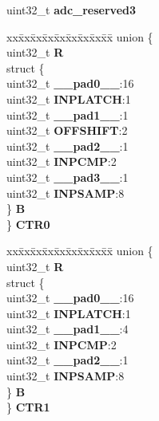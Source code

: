 \begin{DoxyCompactItemize}
\begin{tabbing}
\end{tabbing}\item 
\mbox{\label{structADC__tag_aa17481633a7963b5ddba5b86293eaf4f}} 
uint32\+\_\+t {\bfseries adc\+\_\+reserved3}
\item 
\mbox{\label{structADC__tag_a590d0cc55ca7ebd3c7ebf4bd49cf2f6b}} 
\begin{tabbing}
xx\=xx\=xx\=xx\=xx\=xx\=xx\=xx\=xx\=\kill
union \{\\
\>uint32\_t {\bfseries R}\\
\>struct \{\\
\>\>uint32\_t {\bfseries \_\_pad0\_\_}:16\\
\>\>uint32\_t {\bfseries INPLATCH}:1\\
\>\>uint32\_t {\bfseries \_\_pad1\_\_}:1\\
\>\>uint32\_t {\bfseries OFFSHIFT}:2\\
\>\>uint32\_t {\bfseries \_\_pad2\_\_}:1\\
\>\>uint32\_t {\bfseries INPCMP}:2\\
\>\>uint32\_t {\bfseries \_\_pad3\_\_}:1\\
\>\>uint32\_t {\bfseries INPSAMP}:8\\
\>\} {\bfseries B}\\
\} {\bfseries CTR0}\\

\end{tabbing}\item 
\mbox{\label{structADC__tag_a42d426062235e20cafeb651595a31dfa}} 
\begin{tabbing}
xx\=xx\=xx\=xx\=xx\=xx\=xx\=xx\=xx\=\kill
union \{\\
\>uint32\_t {\bfseries R}\\
\>struct \{\\
\>\>uint32\_t {\bfseries \_\_pad0\_\_}:16\\
\>\>uint32\_t {\bfseries INPLATCH}:1\\
\>\>uint32\_t {\bfseries \_\_pad1\_\_}:4\\
\>\>uint32\_t {\bfseries INPCMP}:2\\
\>\>uint32\_t {\bfseries \_\_pad2\_\_}:1\\
\>\>uint32\_t {\bfseries INPSAMP}:8\\
\>\} {\bfseries B}\\
\} {\bfseries CTR1}\\


\end{tabbing}
\end{DoxyCompactItemize}
